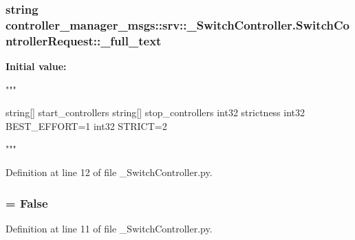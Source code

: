 \subsubsection[{\-\_\-full\-\_\-text}]{\setlength{\rightskip}{0pt plus 5cm}string {\bf controller\-\_\-manager\-\_\-msgs\-::srv\-::\-\_\-\-Switch\-Controller.\-Switch\-Controller\-Request\-::\-\_\-full\-\_\-text}\hspace{0.3cm}{\ttfamily  [static, private]}}\label{classcontroller__manager__msgs_1_1srv_1_1__SwitchController_1_1SwitchControllerRequest_ab0f9bf46a5000a2c16e53f99bc2bca8a}
{\bfseries \-Initial value\-:}
\begin{DoxyCode}
"""

















string[] start_controllers
string[] stop_controllers
int32 strictness
int32 BEST_EFFORT=1
int32 STRICT=2

"""
\end{DoxyCode}


\-Definition at line 12 of file \-\_\-\-Switch\-Controller.\-py.

\subsubsection[{\-\_\-has\-\_\-header}]{ = \-False\hspace{0.3cm}{\ttfamily  [static, private]}}\label{classcontroller__manager__msgs_1_1srv_1_1__SwitchController_1_1SwitchControllerRequest_a10248ce38d90ca8caabd02811b739564}


\-Definition at line 11 of file \-\_\-\-Switch\-Controller.\-py.

